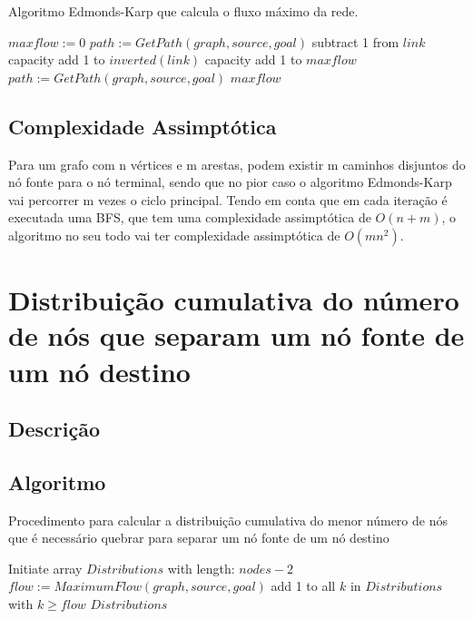 \documentclass[12pt,a4paper]{scrartcl}
\begin{document}
\begin{algorithm}
\caption{Algoritmo Edmonds-Karp que calcula o fluxo máximo da rede.}\label{alg:residual_network}
\begin{algorithmic}[1]
    \State $maxflow := 0 $
    \State $path := GetPath(graph,source,goal)$
      		\State subtract 1 from $link$ capacity
        	\State add 1 to $inverted(link)$ capacity
      \EndFor
      \State add 1 to $maxflow$
      \State $path := GetPath(graph,source,goal)$
  	\EndWhile
  	\Return $maxflow$
\EndProcedure
\end{algorithmic}
\end{algorithm}

\subsection{Complexidade Assimptótica}

Para um grafo com n vértices e m arestas, podem existir m caminhos disjuntos do nó fonte para o nó terminal, sendo que no pior caso o algoritmo Edmonds-Karp vai percorrer m vezes o ciclo principal.
Tendo em conta que em cada iteração é executada uma BFS, que tem uma complexidade assimptótica de $O(n+m)$, o algoritmo no seu todo vai ter complexidade assimptótica de $O(m n^2)$.

\section{Distribuição cumulativa do número de nós que separam um nó fonte de um nó destino}

\subsection{Descrição}

\subsection{Algoritmo}

\begin{algorithm}
\caption{Procedimento para calcular a distribuição cumulativa do menor número de nós que é necessário quebrar para separar um nó fonte de um nó destino}\label{alg:distribution}
\begin{algorithmic}[1]
	\State Initiate array $Distributions$ with length: $nodes - 2$
          	  \State $flow := MaximumFlow(graph,source,goal)$
              	\State add 1 to all $k$ in $Distributions$ with $k \geq flow$
              \EndIf
      \EndFor
    \EndFor
  	\Return $Distributions$
\EndProcedure
\end{algorithmic}
\end{algorithm}
\end{document}
